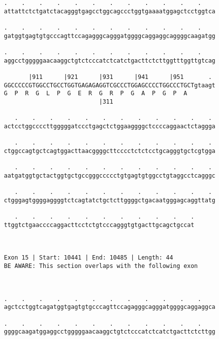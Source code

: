 \documentclass{article}
\begin{document}
\begin{Verbatim}
.    .    .    .    .    .    .    .    .    .    .    .    
attattctctgatctacagggtgagcctggcagccctggtgaaaatggagctcctggtca
                                                            
.    .    .    .    .    .    .    .    .    .    .    .    
gatggtgagtgtgcccagttccagagggcagggatggggcaggaggcaggggcaagatgg
                                                            
.    .    .    .    .    .    .    .    .    .    .    .    
aggcctgggggaacaaggctgtctcccatctcatctgacttctcttggtttggttgtcag
                                                            
       |911      |921      |931      |941      |951       . 
GGCCCCCGTGGCCTGCCTGGTGAGAGAGGTCGCCCTGGAGCCCCTGGCCCTGCTgtaagt
G  P  R  G  L  P  G  E  R  G  R  P  G  A  P  G  P  A        
                           |311                             
  
   .    .    .    .    .    .    .    .    .    .    .    . 
actcctggccccttgggggatccctgagctctggaaggggctccccaggaactctaggga
                                                            
   .    .    .    .    .    .    .    .    .    .    .    . 
ctggccagtgctcagtggacttaacggggcttcccctctctcctgcagggtgctcgtgga
                                                            
   .    .    .    .    .    .    .    .    .    .    .    . 
aatgatggtgctactggtgctgccgggccccctgtgagtgtggcctgtaggcctcagggc
                                                            
   .    .    .    .    .    .    .    .    .    .    .    . 
ctgggagtggggaggggtctcagtatctgctcttggggctgacaatgggagcaggttatg
                                                            
   .    .    .    .    .    .    .    .    .    .    .
ttggtctgaaccccaggacttcctctgtcccagggtgtgacttgcagctgccat
                                                      
                                                      
 
Exon 15 | Start: 10441 | End: 10485 | Length: 44
BE AWARE: This section overlaps with the following exon



.    .    .    .    .    .    .    .    .    .    .    .    
agctcctggtcagatggtgagtgtgcccagttccagagggcagggatggggcaggaggca
                                                            
.    .    .    .    .    .    .    .    .    .    .    .    
ggggcaagatggaggcctgggggaacaaggctgtctcccatctcatctgacttctcttgg
                                                            

\end{Verbatim}
\end{document}
